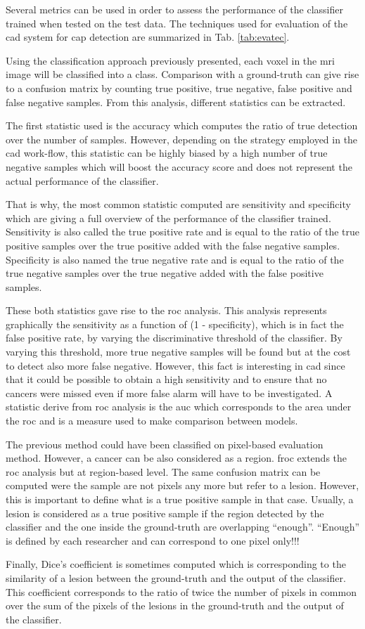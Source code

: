 Several metrics can be used in order to assess the performance of the classifier trained when tested on the test data. The techniques used for evaluation of the \ac{cad} system for \ac{cap} detection are summarized in Tab. \ref{tab:evatec}.

Using the classification approach previously presented, each voxel in the \ac{mri} image will be classified into a class. Comparison with a ground-truth can give rise to a confusion matrix by counting true positive, true negative, false positive and false negative samples. From this analysis, different statistics can be extracted. 

The first statistic used is the accuracy which computes the ratio of true detection over the number of samples. However, depending on the strategy employed in the \ac{cad} work-flow, this statistic can be highly biased by a high number of true negative samples which will boost the accuracy score and does not represent the actual performance of the classifier.

That is why, the most common statistic computed are sensitivity and specificity which are giving a full overview of the performance of the classifier trained. Sensitivity is also called the true positive rate and is equal to the ratio of the true positive samples over the true positive added with the false negative samples. Specificity is also named the true negative rate and is equal to the ratio of the true negative samples over the true negative added with the false positive samples.

These both statistics gave rise to the \acf{roc} analysis. This analysis represents graphically the sensitivity as a function of (1 - specificity), which is in fact the false positive rate, by varying the discriminative threshold of the classifier. By varying this threshold, more true negative samples will be found but at the cost to detect also more false negative. However, this fact is interesting in \ac{cad} since that it could be possible to obtain a high sensitivity and to ensure that no cancers were missed even if more false alarm will have to be investigated. A statistic derive from \ac{roc} analysis is the \acf{auc} which corresponds to the area under the \ac{roc} and is a measure used to make comparison between models. 

The previous method could have been classified on pixel-based evaluation method. However, a cancer can be also considered as a region. \Acf{froc} extends the \ac{roc} analysis but at region-based level. The same confusion matrix can be computed were the sample are not pixels any more but refer to a lesion. However, this is important to define what is a true positive sample in that case. Usually, a lesion is considered as a true positive sample if the region detected by the classifier and the one inside the ground-truth are overlapping ``enough''. ``Enough'' is defined by each researcher and can correspond to one pixel only!!!

Finally, Dice's coefficient is sometimes computed which is corresponding to the similarity of a lesion between the ground-truth and the output of the classifier. This coefficient corresponds to the ratio of twice the number of pixels in common over the sum of the pixels of the lesions in the ground-truth and the output of the classifier.
